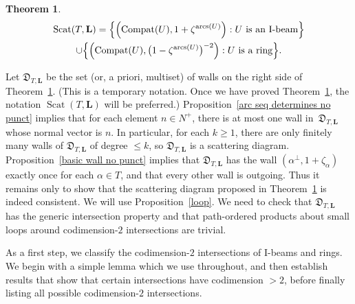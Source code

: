 \documentclass{amsart}
\newtheorem{theorem}[proposition]{Theorem}
\theoremstyle{definition}
\theoremstyle{remark}
\numberwithin{equation}{section}
\newcommand{\settt}[1]{{\Bigl\lbrace #1 \Bigr\rbrace}}
\newcommand{\D}{{\mathfrak D}}
\newcommand{\0}{{\mathbf{0}}}
\renewcommand{\L}{\mathbf{L}}
\newcommand{\Scat}{\operatorname{Scat}}
\newcommand{\Compat}{\operatorname{Compat}}
\newcommand{\arcs}{\operatorname{arcs}}
\begin{document}
\begin{theorem}\label{scat diag}
\begin{multline*}
\Scat(T,\L)=\settt{\Bigl(\Compat(U),1+\zeta^{\arcs(U)}\Bigr):U\text{ is an I-beam}}\\\cup\settt{\Bigl(\Compat(U),\bigl(1-\zeta^{\arcs(U)}\bigr)^{-2}\Bigr):U\text{ is a ring}}.
\end{multline*}
\end{theorem}

Let $\D_{T,\L}$ be the set (or, a priori, multiset) of walls on the right side of Theorem~\ref{scat diag}.
(This is a temporary notation.  
Once we have proved Theorem~\ref{scat diag}, the notation $\Scat(T,\L)$ will be preferred.)
Proposition~\ref{arc seq determines no punct} implies that for each element $n\in N^+$, there is at most one wall in~$\D_{T,\L}$ whose normal vector is $n$.  
In particular, for each $k\ge1$, there are only finitely many walls of $\D_{T,\L}$ of degree $\le k$, so $\D_{T,\L}$ is a scattering diagram.
Proposition~\ref{basic wall no punct} implies that $\D_{T,\L}$ has the wall $(\alpha^\perp,1+\zeta_\alpha)$ exactly once for each $\alpha\in T$, and that every other wall is outgoing.
Thus it remains only to show that the scattering diagram proposed in Theorem~\ref{scat diag} is indeed consistent.
We will use Proposition~\ref{loop}.
We need to check that $\D_{T,\L}$ has the generic intersection property and that path-ordered products about small loops around codimension-$2$ intersections are trivial.

As a first step, we classify the codimension-$2$ intersections of I-beams and rings.
We begin with a simple lemma which we use throughout, and then establish results that show that certain intersections have codimension $>2$, before finally listing all possible codimension-$2$ intersections.
\end{document}
